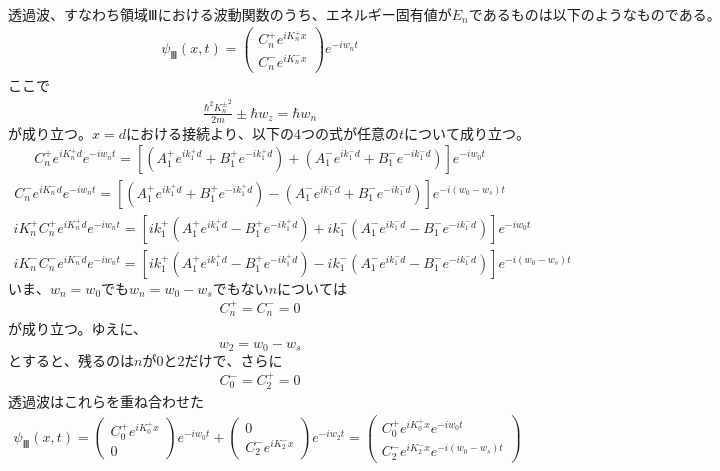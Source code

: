 $透過波、すなわち領域Ⅲにおける波動関数のうち、エネルギー固有値がE_{n}であるものは以下のようなものである。$
\begin{align}
{\psi}_{Ⅲ}(x,t)=
\begin{pmatrix}
C_{n}^{+}e^{iK_{n}^{+}x} \\
C_{n}^{-}e^{iK_{n}^{-}x}
\end{pmatrix}
e^{-iw_{n}t}
\end{align}
ここで
\begin{align}
\frac{{{\hbar}^2}{K_{n}^{\pm}}^2}{2m}{\pm}{\hbar}w_{z}={\hbar}w_{n}
\end{align}
$が成り立つ。x=dにおける接続より、以下の4つの式が任意のtについて成り立つ。$
\begin{align}
C_{n}^{+}e^{iK_{n}^{+}d}e^{-iw_{n}t}=\left[(A_{1}^{+}e^{ik_{1}^{+}d}+B_{1}^{+}e^{-ik_{1}^{+}d})+(A_{1}^{-}e^{ik_{1}^{-}d}+B_{1}^{-}e^{-ik_{1}^{-}d})\right]e^{-iw_{0}t}
\end{align}
\begin{align}
C_{n}^{-}e^{iK_{n}^{-}d}e^{-iw_{n}t}=\left[(A_{1}^{+}e^{ik_{1}^{+}d}+B_{1}^{+}e^{-ik_{1}^{+}d})-(A_{1}^{-}e^{ik_{1}^{-}d}+B_{1}^{-}e^{-ik_{1}^{-}d})\right]e^{-i(w_{0}-w_{s})t}
\end{align}
\begin{align}
iK_{n}^{+}C_{n}^{+}e^{iK_{n}^{+}d}e^{-iw_{n}t}=\left[ik_{1}^{+}(A_{1}^{+}e^{ik_{1}^{+}d}-B_{1}^{+}e^{-ik_{1}^{+}d})+ik_{1}^{-}(A_{1}^{-}e^{ik_{1}^{-}d}-B_{1}^{-}e^{-ik_{1}^{-}d})\right]e^{-iw_{0}t}
\end{align}
\begin{align}
iK_{n}^{-}C_{n}^{-}e^{iK_{n}^{-}d}e^{-iw_{n}t}=\left[ik_{1}^{+}(A_{1}^{+}e^{ik_{1}^{+}d}-B_{1}^{+}e^{-ik_{1}^{+}d})-ik_{1}^{-}(A_{1}^{-}e^{ik_{1}^{-}d}-B_{1}^{-}e^{-ik_{1}^{-}d})\right]e^{-i(w_{0}-w_{s})t}
\end{align}
$いま、w_{n}=w_{0}でもw_{n}=w_{0}-w_{s}でもないnについては$
\begin{align}
C_{n}^{+}=C_{n}^{-}=0
\end{align}
が成り立つ。ゆえに、
\begin{align}
w_{2}=w_{0}-w_{s}
\end{align}
$とすると、残るのはnが0と2だけで、さらに$
\begin{align}
C_{0}^{-}=C_{2}^{+}=0
\end{align}
透過波はこれらを重ね合わせた
\begin{align}
{\psi}_{Ⅲ}(x,t)=
\begin{pmatrix}
C_{0}^{+}e^{iK_{0}^{+}x} \\
0
\end{pmatrix}
e^{-iw_{0}t}+
\begin{pmatrix}
0 \\
C_{2}^{-}e^{iK_{2}^{-}x}
\end{pmatrix}
e^{-iw_{2}t}
=\begin{pmatrix}
C_{0}^{+}e^{iK_{0}^{+}x}e^{-iw_{0}t} \\
C_{2}^{-}e^{iK_{2}^{-}x}e^{-i(w_{0}-w_{s})t}
\end{pmatrix}
\end{align}
